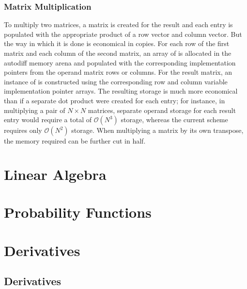 \documentclass[10pt]{article}
\begin{document}
\subsubsection{Matrix Multiplication}

To multiply two matrices, a matrix is created for the result and each
entry is populated with the appropriate product of a row vector and
column vector.  But the way in which it is done is economical in
copies.  For each row of the first matrix and each column of the
second matrix, an array of  is allocated in the autodiff
memory arena and populated with the corresponding implementation
pointers from the operand matrix rows or columns.  For the result
matrix, an instance of  is constructed using
the corresponding row and column variable implementation pointer
arrays.  The resulting storage is much more economical than if a
separate dot product were created for each entry; for instance, in
multiplying a pair of $N \times N$ matrices, separate operand storage
for each result entry would require a total of $\mathcal{O}(N^3)$
storage, whereas the current scheme requires only $\mathcal{O}(N^2)$
storage.  When multiplying a matrix by its own transpose, the memory
required can be further cut in half.





\section{Linear Algebra}





\section{Probability Functions}






\clearpage
\appendix

\section{Derivatives}\label{derivative-definitions.section}

\subsection{Derivatives}
\end{document}
